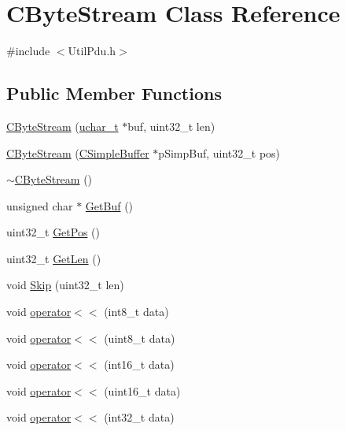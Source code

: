 \hypertarget{class_c_byte_stream}{}\section{C\+Byte\+Stream Class Reference}
\label{class_c_byte_stream}


{\ttfamily \#include $<$Util\+Pdu.\+h$>$}

\subsection*{Public Member Functions}
\begin{DoxyCompactItemize}
\item 
\hyperlink{class_c_byte_stream_a273d21f1c7225997af8aa19ea49361ab}{C\+Byte\+Stream} (\hyperlink{base_2ostype_8h_a124ea0f8f4a23a0a286b5582137f0b8d}{uchar\+\_\+t} $\ast$buf, uint32\+\_\+t len)
\item 
\hyperlink{class_c_byte_stream_a2c8c28b8329f283118e53833935cdcb4}{C\+Byte\+Stream} (\hyperlink{class_c_simple_buffer}{C\+Simple\+Buffer} $\ast$p\+Simp\+Buf, uint32\+\_\+t pos)
\item 
\hyperlink{class_c_byte_stream_a6acb540216b3617d63e35b52f3e1ae70}{$\sim$\+C\+Byte\+Stream} ()
\item 
unsigned char $\ast$ \hyperlink{class_c_byte_stream_aeaa66ee7d51d5339d5a6622c8761c4de}{Get\+Buf} ()
\item 
uint32\+\_\+t \hyperlink{class_c_byte_stream_a8bf5c4bb150fa58cf0aa57fecf0c405e}{Get\+Pos} ()
\item 
uint32\+\_\+t \hyperlink{class_c_byte_stream_a85144d62093290997f301a1cceaa66b9}{Get\+Len} ()
\item 
void \hyperlink{class_c_byte_stream_a18fb02b9eba1faacf4f276c476c7309e}{Skip} (uint32\+\_\+t len)
\item 
void \hyperlink{class_c_byte_stream_a4a700413c0f3ac52e3be32cd240eb5a4}{operator$<$$<$} (int8\+\_\+t data)
\item 
void \hyperlink{class_c_byte_stream_ab3aadcccdde9fb4ad3312b9ef08e320f}{operator$<$$<$} (uint8\+\_\+t data)
\item 
void \hyperlink{class_c_byte_stream_a383b813b68b502bcc1948aaf5d924e0a}{operator$<$$<$} (int16\+\_\+t data)
\item 
void \hyperlink{class_c_byte_stream_a3a58c1aac087da67cb704cbe57cb25ca}{operator$<$$<$} (uint16\+\_\+t data)
\item 
void \hyperlink{class_c_byte_stream_a49db2cdfcaf13feb59df6467471efaf9}{operator$<$$<$} (int32\+\_\+t data)

\end{DoxyCompactItemize}
